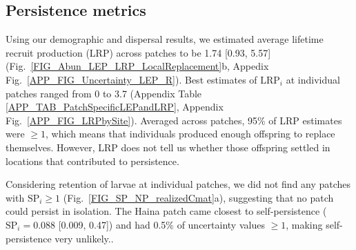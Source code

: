 \documentclass[12pt, oneside]{article}   	%
\begin{document}
\subsection*{Persistence metrics}

Using our demographic and dispersal results, we estimated average lifetime recruit production (LRP) across patches to be 1.74 [0.93, 5.57] (Fig.\ \ref{FIG_Abun_LEP_LRP_LocalReplacement}b, Appedix Fig.\ \ref{APP_FIG_Uncertainty_LEP_R}). Best estimates of $\text{LRP}_i$ at individual patches ranged from 0 to 3.7 (Appendix Table \ref{APP_TAB_PatchSpecificLEPandLRP}, Appendix Fig.\ \ref{APP_FIG_LRPbySite}). Averaged across patches, 95\% of LRP estimates were $\geq 1$, which means that individuals produced enough offspring to replace themselves. However, LRP does not tell us whether those offspring settled in locations that contributed to persistence.


Considering retention of larvae at individual patches, we did not find any patches with $\text{SP}_{i} \geq 1$ (Fig.\ \ref{FIG_SP_NP_realizedCmat}a), suggesting that no patch could persist in isolation. The Haina patch came closest to self-persistence ($\text{SP}_i = 0.088$ [0.009, 0.47]) and had 0.5\% of uncertainty values $ \geq 1$, making self-persistence very unlikely.. %

\end{document}
